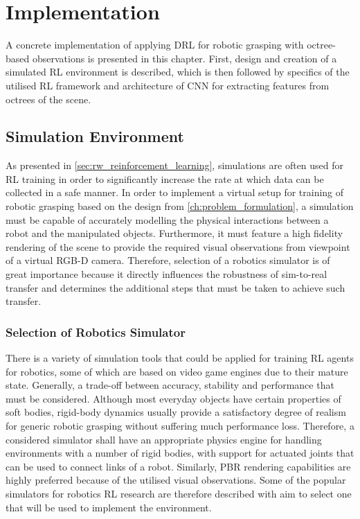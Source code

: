 \chapter{Implementation}\label{ch:implementation}

A concrete implementation of applying DRL for robotic grasping with octree-based observations is presented in this chapter. First, design and creation of a simulated RL environment is described, which is then followed by specifics of the utilised RL framework and architecture of CNN for extracting features from octrees of the scene.


\section{Simulation Environment}\label{sec:impl_simulation_environment}

As presented in \autoref{sec:rw_reinforcement_learning}, simulations are often used for RL training in order to significantly increase the rate at which data can be collected in a safe manner. In order to implement a virtual setup for training of robotic grasping based on the design from \autoref{ch:problem_formulation}, a simulation must be capable of accurately modelling the physical interactions between a robot and the manipulated objects. Furthermore, it must feature a high fidelity rendering of the scene to provide the required visual observations from viewpoint of a virtual RGB-D camera. Therefore, selection of a robotics simulator is of great importance because it directly influences the robustness of sim-to-real transfer and determines the additional steps that must be taken to achieve such transfer.


\subsection{Selection of Robotics Simulator}

There is a variety of simulation tools that could be applied for training RL agents for robotics, some of which are based on video game engines due to their mature state. Generally, a trade-off between accuracy, stability and performance that must be considered. Although most everyday objects have certain properties of soft bodies, rigid-body dynamics usually provide a satisfactory degree of realism for generic robotic grasping without suffering much performance loss. Therefore, a considered simulator shall have an appropriate physics engine for handling environments with a number of rigid bodies, with support for actuated joints that can be used to connect links of a robot. Similarly, PBR rendering capabilities are highly preferred because of the utilised visual observations. Some of the popular simulators for robotics RL research are therefore described with aim to select one that will be used to implement the environment.

